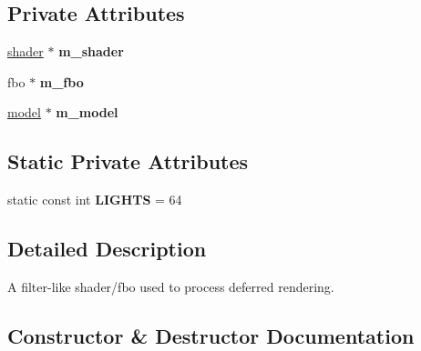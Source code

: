 \subsection*{Private Attributes}
\begin{DoxyCompactItemize}
\item 
\mbox{\label{classflounder_1_1deferredrenderer_aa3b23b38544636f0ac7225fd4a3e6846}} 
\hyperlink{classflounder_1_1shader}{shader} $\ast$ {\bfseries m\+\_\+shader}
\item 
\mbox{\label{classflounder_1_1deferredrenderer_a771f3f5131354fb4dcce1fc1a59957cf}} 
fbo $\ast$ {\bfseries m\+\_\+fbo}
\item 
\mbox{\label{classflounder_1_1deferredrenderer_a4f90f33b5091fc3d1d46d7bb02ce56f8}} 
\hyperlink{classflounder_1_1model}{model} $\ast$ {\bfseries m\+\_\+model}
\end{DoxyCompactItemize}
\subsection*{Static Private Attributes}
\begin{DoxyCompactItemize}
\item 
\mbox{\label{classflounder_1_1deferredrenderer_a5f3e9727638d5476a66e69a521db1d40}} 
static const int {\bfseries L\+I\+G\+H\+TS} = 64
\end{DoxyCompactItemize}


\subsection{Detailed Description}
A filter-\/like shader/fbo used to process deferred rendering. 



\subsection{Constructor \& Destructor Documentation}
\mbox{\label{classflounder_1_1deferredrenderer_a1eb8e53d1705eaee945d28677fb41bcc}} 
